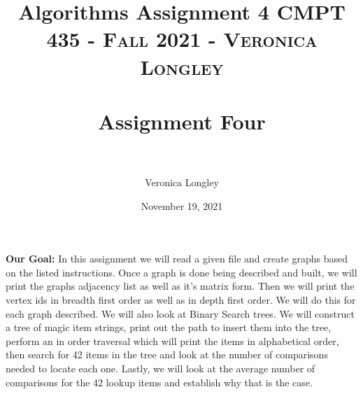 \documentclass{article}
\title{\textbf{Algorithms Assignment 4}}
\author{Veronica Longley }
\date{November 19, 2021}
\title{	
   \normalfont \normalsize 
   \textsc{CMPT 435 - Fall 2021 - Veronica Longley} \\[10pt] %
   \horrule{0.5pt} \\[0.25cm] 	%
   \huge Assignment Four    	    \\ %
   \horrule{0.5pt} \\[0.25cm] 	%
}
\begin{document}
\lstset{numbers= left}
\lstset{language=Java}
\huge
\newcommand{\horrule}[1]{\rule{\linewidth}{#1}}

\maketitle{}


\pagebreak
\large
\textbf{Our Goal:}
In this assignment we will read a given file and create graphs based on the listed instructions. Once a graph is done being described and built, we will print the graphs adjacency list as well as it's matrix form. Then we will print the vertex ids in breadth first order as well as in depth first order. We will do this for each graph described. We will also look at Binary Search trees. We will construct a tree of magic item strings, print out the path to insert them into the tree, perform an in order traversal which will print the items in alphabetical order, then search for 42 items in the tree and look at the number of comparisons needed to locate each one. Lastly, we will look at the average number of comparisons for the 42 lookup items and establish why that is the case.  

\small
\end{document}
